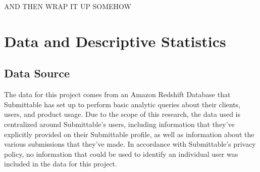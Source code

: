 \documentclass[]{report}   %
\begin{document}
AND THEN WRAP IT UP SOMEHOW

\chapter{Data and Descriptive Statistics}         
\section{Data Source}
The data for this project comes from an Amazon Redshift Database that Submittable has set up to perform basic analytic queries about their clients, users, and product usage. Due to the scope of this research, the data used is centralized around Submittable's users, including information that they've explicitly provided on their Submittable profile, as well as information about the various submissions that they've made. In accordance with Submittable's privacy policy, no information that could be used to identify an individual user was included in the data for this project.
\end{document}

